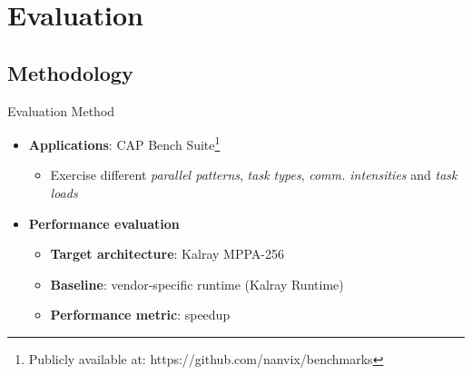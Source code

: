 \documentclass[english,aspectratio=169]{lapesd-slides}
\begin{document}
  \section{Evaluation}

    \subsection{Methodology}
      \begin{frame}{Evaluation Method}
        \begin{itemize}
          \item \textbf{Applications}: CAP Bench Suite\footnote[frame]{\scriptsize Publicly available at: https://github.com/nanvix/benchmarks}~\cite{Souza2017}
          
          \begin{itemize}
            \item Exercise different \textit{parallel patterns}, \textit{task types}, \textit{comm.
              intensities} and \textit{task loads}
          \end{itemize}
        \end{itemize}

        \begin{table}[b]
          \centering
          \label{table:apps}
        \end{table}

        \begin{itemize}
          \item \textbf{Performance evaluation}

          \begin{itemize}
            \item \textbf{Target architecture}: Kalray MPPA-256~\cite{DeDinechin2013-2}
            \item \textbf{Baseline}: vendor-specific runtime (Kalray Runtime)
            \item \textbf{Performance metric}: speedup
          \end{itemize}
        \end{itemize}
      \end{frame}
\end{document}
